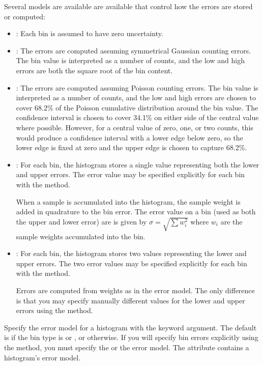 Several models are available are available that control how the errors
are stored or computed:
\begin{itemize}
 \item {}: Each bin is assumed to have zero uncertainty.

 \item {}: The errors are computed assuming symmetrical
 Gaussian counting errors.  The bin value is interpreted as a number of
 counts, and the low and high errors are both the square root of the bin
 content.

 \item {}: The errors are computed assuming Poisson
 counting errors.  The bin value is interpreted as a number of counts,
 and the low and high errors are chosen to cover 68.2\% of the Poisson
 cumulative distribution around the bin value.  The confidence interval
 is chosen to cover 34.1\% on either side of the central value where
 possible.  However, for a central value of zero, one, or two counts,
 this would produce a confidence interval with a lower edge below zero,
 so the lower edge is fixed at zero and the upper edge is chosen to
 capture 68.2\%.

 \item {}: For each bin, the histogram stores a single
 value representing both the lower and upper errors.  The error value
 may be specified explicitly for each bin with the 
 method.  

 When a sample is accumulated into the histogram, the sample weight is
 added in quadrature to the bin error.  The error value on a bin (used
 as both the upper and lower error) are is given by $\sigma=\sqrt{\sum
 w_i^2}$ where $w_i$ are the sample weights accumulated into the bin.

 \item {}: For each bin, the histogram stores two
 values representing the lower and upper errors.  The two error values
 may be specified explicitly for each bin with the 
 method.  

 Errors are computed from weights as in the  error
 model.  The only difference is that you may specify manually different
 values for the lower and upper errors using the 
 method.
\end{itemize}

Specify the error model for a histogram with the 
keyword argument.  The default is  if the bin type is
 or , or  otherwise.  If you will
specify bin errors explicitly using the  method, you
must specify the  or the 
error model.  The  attribute contains a histogram's
error model.

